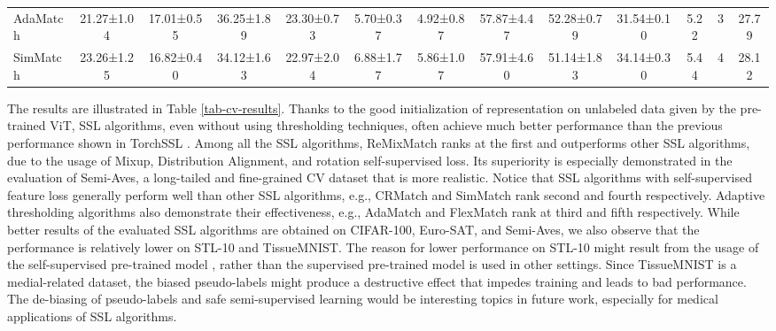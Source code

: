 \documentclass{article}
\begin{document}
\begin{table}[t!]
{\begin{tabular}{l|cc|cc|cc|cc|c|c|c|c}
AdaMatch         & 21.27\tiny{±1.04}                        & 17.01\tiny{±0.55}                        & 36.25\tiny{±1.89}                    & 23.30\tiny{±0.73}                     & 5.70\tiny{±0.37}                       & 4.92\tiny{±0.87}                       & 57.87\tiny{±4.47}                          & 52.28\tiny{±0.79}                           & 31.54\tiny{±0.10}                           & 5.22                              & 3                              & 27.79                               \\
SimMatch         & 23.26\tiny{±1.25}                        & 16.82\tiny{±0.40}                        & 34.12\tiny{±1.63}                    & 22.97\tiny{±2.04}                     & 6.88\tiny{±1.77}                       & 5.86\tiny{±1.07}                       & 57.91\tiny{±4.60}                          & 51.14\tiny{±1.83}                           & 34.14\tiny{±0.30}                           & 5.44                              & 4                              & 28.12                              \\



\bottomrule
\end{tabular}
}
\end{table}





The results are illustrated in Table \ref{tab-cv-results}.
Thanks to the good initialization of representation on unlabeled data given by the pre-trained ViT, SSL algorithms, even without using thresholding techniques, often achieve much better performance than the previous performance shown in TorchSSL \cite{zhang2021flexmatch}. Among all the SSL algorithms, ReMixMatch \cite{berthelot2019remixmatch} ranks at the first and outperforms other SSL algorithms, due to the usage of Mixup, Distribution Alignment, and rotation self-supervised loss. Its superiority is especially demonstrated in the evaluation of Semi-Aves, a long-tailed and fine-grained CV dataset that is more realistic. Notice that SSL algorithms with self-supervised feature loss generally perform well than other SSL algorithms, e.g., CRMatch \cite{fan2021revisiting} and SimMatch \cite{zheng2022simmatch} rank second and fourth respectively. Adaptive thresholding algorithms also demonstrate their effectiveness, e.g., AdaMatch \cite{berthelot2021adamatch} and FlexMatch \cite{zhang2021flexmatch} rank at third and fifth respectively.  While better results of the evaluated SSL algorithms are obtained on CIFAR-100, Euro-SAT, and Semi-Aves, we also observe that the performance is relatively lower on STL-10 and TissueMNIST. The reason for lower performance on STL-10 might result from the usage of the self-supervised pre-trained model \cite{he2021masked}, rather than the supervised pre-trained model is used in other settings. Since TissueMNIST is a medial-related dataset, the biased pseudo-labels might produce a destructive effect that impedes training and leads to bad performance. The de-biasing of pseudo-labels and safe semi-supervised learning would be interesting topics in future work, especially for medical applications of SSL algorithms. 
\end{document}
